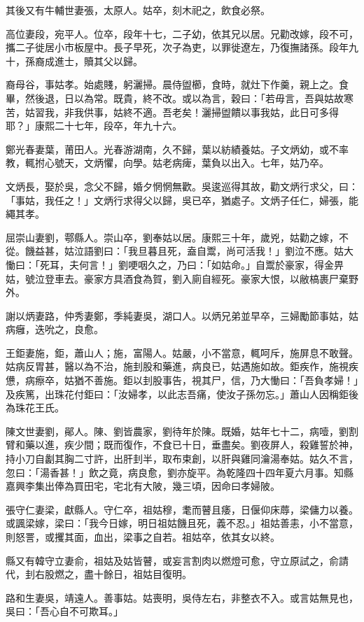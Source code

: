 \begin{pinyinscope}
其後又有牛輔世妻張，太原人。姑卒，刻木祀之，飲食必祭。

高位妻段，宛平人。位卒，段年十七，二子幼，依其兄以居。兄勸改嫁，段不可，攜二子徙居小市板屋中。長子早死，次子為吏，以罪徙遼左，乃復撫諸孫。段年九十，孫裔成進士，贖其父以歸。

裔母谷，事姑孝。始處賤，躬灑掃。晨侍盥櫛，食時，就灶下作羹，親上之。食畢，然後退，日以為常。既貴，終不改。或以為言，穀曰：「若毋言，吾與姑故寒苦，姑習我，非我供事，姑終不適。吾老矣！灑掃盥饋以事我姑，此日可多得耶？」康熙二十七年，段卒，年九十六。

鄭光春妻葉，莆田人。光春游湖南，久不歸，葉以紡績養姑。子文炳幼，或不率教，輒拊心號天，文炳懼，向學。姑老病痺，葉負以出入。七年，姑乃卒。

文炳長，娶於吳，念父不歸，婚夕惘惘無歡。吳逡巡得其故，勸文炳行求父，曰：「事姑，我任之！」文炳行求得父以歸，吳已卒，猶處子。文炳子任仁，婦張，能繩其孝。

屈崇山妻劉，鄠縣人。崇山卒，劉奉姑以居。康熙三十年，歲兇，姑勸之嫁，不從。饑益甚，姑泣語劉曰：「我旦暮且死，盍自鬻，尚可活我！」劉泣不應。姑大慟曰：「死耳，夫何言！」劉哽咽久之，乃曰：「如姑命。」自鬻於豪家，得金畀姑，號泣登車去。豪家方具酒食為賀，劉入廁自經死。豪家大恨，以敝槁裹尸棄野外。

謝以炳妻路，仲秀妻鄭，季純妻吳，湖口人。以炳兄弟並早卒，三婦勵節事姑，姑病癰，迭吮之，良愈。

王鉅妻施，鉅，蕭山人；施，富陽人。姑嚴，小不當意，輒呵斥，施屏息不敢聲。姑病反胃甚，醫以為不治，施刲股和藥進，病良已，姑遇施如故。鉅疾作，施視疾憊，病瘵卒，姑猶不善施。鉅以刲股事告，視其尸，信，乃大慟曰：「吾負孝婦！」及疾篤，出珠花付鉅曰：「汝婦孝，以此志吾痛，使汝子孫勿忘。」蕭山人因稱鉅後為珠花王氏。

陳文世妻劉，鄖人。陳、劉皆農家，劉待年於陳。既婚，姑年七十二，病噎，劉割臂和藥以進，疾少間；既而復作，不食已十日，垂盡矣。劉夜屏人，殺雞誓於神，持小刀自劙其胸二寸許，出肝刲半，取布束創，以肝與雞同瀹湯奉姑。姑久不言，忽曰：「湯香甚！」飲之竟，病良愈，劉亦旋平。為乾隆四十四年夏六月事。知縣嘉興李集出俸為買田宅，宅北有大陂，幾三頃，因命曰孝婦陂。

張守仁妻梁，獻縣人。守仁卒，祖姑穆，耄而瞽且痿，日偃仰床蓐，梁傭力以養。或諷梁嫁，梁曰：「我今日嫁，明日祖姑饑且死，義不忍。」祖姑善恚，小不當意，則怒詈，或攫其面，血出，梁事之自若。祖姑卒，依其女以終。

縣又有韓守立妻俞，祖姑及姑皆瞽，或妄言割肉以燃燈可愈，守立原試之，俞請代，刲右股燃之，盡十餘日，祖姑目復明。

路和生妻吳，靖遠人。善事姑。姑喪明，吳侍左右，非整衣不入。或言姑無見也，吳曰：「吾心自不可欺耳。」


\end{pinyinscope}

